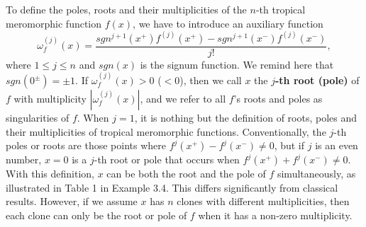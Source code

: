 \documentclass{article}
\begin{document}
To define the poles, roots and their multiplicities of the $n$-th tropical meromorphic function $f(x)$, we have to introduce an auxiliary function
\begin{equation}\label{2a2}
    \omega_{f}^{(j)}(x)=\frac{sgn^{j+1}(x^{+})f^{(j)}(x^{+})-sgn^{j+1}(x^{-})f^{(j)}(x^{-})}{j!},
\end{equation}
where $1\leq j \leq n$ and $sgn(x)$ is the signum function. We remind here that $sgn(0^{\pm})=\pm1$. If $\omega_{f}^{(j)}(x)>0 $ ($<0$), then we call $x$ the \textbf{$j$-th root (pole)} of $f$ with multiplicity $|\omega_{f}^{(j)}(x)|$, and we refer to all $f$'s roots and poles as singularities of $f$. When $j=1$, it is nothing but the definition of roots, poles and their multiplicities of tropical meromorphic functions. Conventionally, the $j$-th poles or roots are those points where $f^{j}(x^{+})-f^{j}(x^{-})\neq 0$, but if $j$ is an even number, $x=0$ is a $j$-th root or pole that occurs when $f^{j}(x^{+})+f^{j}(x^{-})\neq 0$. With this definition, $x$ can be both the root and the pole of $f$ simultaneously, as illustrated in Table 1 in Example 3.4. This differs significantly from classical results. However, if we assume $x$ has $n$ clones with different multiplicities, then each clone can only be the root or pole of $f$ when it has a non-zero multiplicity.
\end{document}
